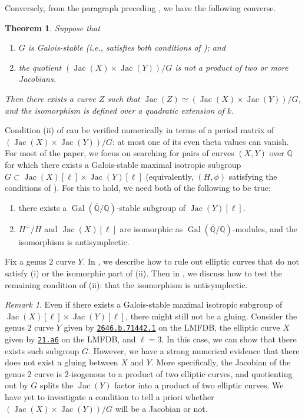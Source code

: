 \documentclass{amsproc}
\numberwithin{equation}{section}
\newtheorem{theorem}[equation]{Theorem}
\theoremstyle{definition}
\theoremstyle{remark}
\newtheorem{remark}[equation]{Remark}
\DeclareMathOperator{\Jac}{Jac}
\DeclareMathOperator{\Gal}{Gal}
\newcommand{\QQ}{\mathbb Q}
\newcommand{\Qbar}{\overline{\QQ}}
\newcommand{\GalQ}{\Gal(\Qbar/\QQ)}
\begin{document}
Conversely, from the paragraph preceding , we have the following converse.
\begin{theorem}
    \label{thm:gluability_converse}
    Suppose that
    \begin{enumerate}[label=(\roman*)]
    \item $G$ is Galois-stable (i.e., satisfies both conditions of ); and
    \item the quotient $(\Jac(X)\times\Jac(Y))/G$ is not a product of two or more Jacobians.
    \end{enumerate}
Then there exists a curve $Z$ such that $\Jac(Z)\simeq (\Jac(X)\times\Jac(Y))/G$, and the isomorphism is defined over a quadratic extension of $k$.
\end{theorem}
Condition (ii) of  can be verified numerically in terms of a period matrix of $(\Jac(X)\times \Jac(Y))/G$: at most one of its even theta values can vanish.
For most of the paper, we focus on searching for pairs of curves $(X,Y)$ over $\QQ$ for which there exists a Galois-stable maximal isotropic subgroup $G\subset\Jac(X)[\ell]\times\Jac(Y)[\ell]$ (equivalently, $(H,\phi)$ satisfying the conditions of ). For this to hold, we need both of the following to be true:
\begin{enumerate}[label=(\roman*)]
\item there exists a $\GalQ$-stable subgroup of $\Jac(Y)[\ell]$.
\item $H^\perp/H$ and $\Jac(X)[\ell]$ are isomorphic as $\GalQ$-modules, and the isomorphism is antisymplectic.
\end{enumerate}
Fix a genus $2$ curve $Y$.
In , we describe how to rule out elliptic curves that do not satisfy (i) or the isomorphic part of (ii).
Then in , we discuss how to test the remaining condition of (ii): that the isomorphism is antisymplectic.

\begin{remark}
    \label{rmk:decomposable_jacobian}
    Even if there exists a Galois-stable maximal isotropic subgroup of $\Jac(X)[\ell]\times \Jac(Y)[\ell]$, there might still not be a gluing.
    Consider the genus $2$ curve $Y$ given by \href{https://www.lmfdb.org/Genus2Curve/Q/2646/b/71442/1}{\texttt{2646.b.71442.1}} on the LMFDB, the elliptic curve $X$ given by \href{https://www.lmfdb.org/EllipticCurve/Q/21/a/6}{\texttt{21.a6}} on the LMFDB, and $\ell=3$.
    In this case, we can show that there exists such subgroup $G$. 
    However, we have a strong numerical evidence that there does not exist a gluing between $X$ and $Y$. More specifically, the Jacobian of the genus 2 curve is $2$-isogenous to a product of two elliptic curves, and quotienting out by $G$ splits the $\Jac(Y)$ factor into a product of two elliptic curves.
    We have yet to investigate a condition to tell a priori whether $(\Jac(X)\times \Jac(Y))/G$ will be a Jacobian or not.
\end{remark}
\end{document}
